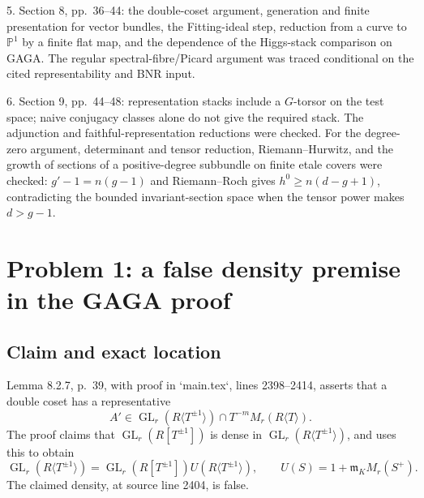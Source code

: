 \documentclass[10pt]{article}
\begin{document}
5. Section 8, pp. 36–44: the double-coset argument, generation and finite presentation for vector bundles, the Fitting-ideal step, reduction from a curve to \(\mathbb P^1\) by a finite flat map, and the dependence of the Higgs-stack comparison on GAGA. The regular spectral-fibre/Picard argument was traced conditional on the cited representability and BNR input.\par
6. Section 9, pp. 44–48: representation stacks include a \(G\)-torsor on the test space; naive conjugacy classes alone do not give the required stack. The adjunction and faithful-representation reductions were checked. For the degree-zero argument, determinant and tensor reduction, Riemann–Hurwitz, and the growth of sections of a positive-degree subbundle on finite etale covers were checked: \(g'-1=n(g-1)\) and Riemann–Roch gives \(h^0\geq n(d-g+1)\), contradicting the bounded invariant-section space when the tensor power makes \(d>g-1\).\par
\section*{Problem 1: a false density premise in the GAGA proof}
\subsection*{Claim and exact location}
Lemma 8.2.7, p. 39, with proof in `main.tex`, lines 2398–2414, asserts that a double coset has a representative \[A'\in \operatorname{GL}_r(R\langle T^{\pm1}\rangle)
       \cap T^{-m}M_r(R\langle T\rangle).\] The proof claims that \(\operatorname{GL}_r(R[T^{\pm1}])\) is dense in \(\operatorname{GL}_r(R\langle T^{\pm1}\rangle)\), and uses this to obtain \[\operatorname{GL}_r(R\langle T^{\pm1}\rangle)
 =\operatorname{GL}_r(R[T^{\pm1}])U(R\langle T^{\pm1}\rangle),
 \qquad U(S)=1+\mathfrak m_KM_r(S^+).\] The claimed density, at source line 2404, is false.\par
\end{document}
